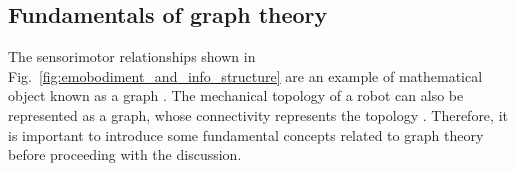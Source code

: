

\subsection{Fundamentals of graph theory}
The sensorimotor relationships shown in Fig.~\ref{fig:emobodiment_and_info_structure} are an example of mathematical object known as a graph \cite{West2001Introductiongraphtheory}. The mechanical topology of a robot can also be represented as a graph, whose connectivity represents the topology \cite{Featherstone2007RigidBodyDynamics}. Therefore, it is important to introduce some fundamental concepts related to graph theory before proceeding with the discussion. 

